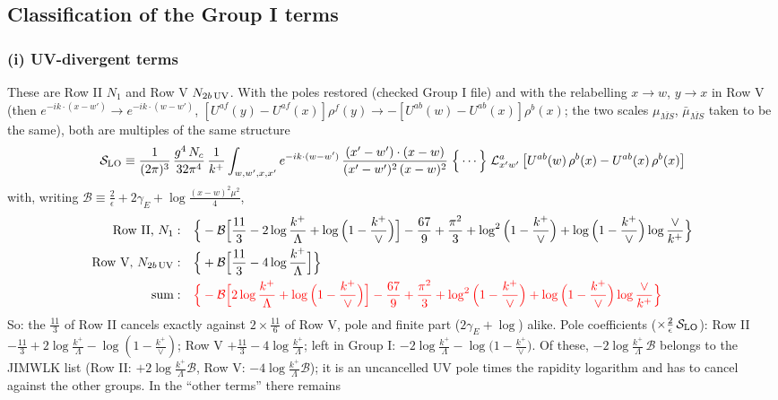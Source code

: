 \documentclass[9pt]{article}
\numberwithin{equation}{section}
\begin{document}
\subsection{Classification of the Group I terms}
\subsubsection*{(i) UV-divergent terms}
These are Row II $N_{1}$ and Row V $N_{2b\,\rm UV}$. With the poles restored (checked Group I file) and with the relabelling $x\to w$, $y\to x$ in Row V (then $e^{-ik\cdot(x-w')}\to e^{-ik\cdot(w-w')}$, $[U^{af}(y)-U^{af}(x)]\rho^{f}(y)\to-[U^{ab}(w)-U^{ab}(x)]\rho^{b}(x)$; the two scales $\mu_{\overline{MS}}$, $\bar\mu_{\overline{MS}}$ taken to be the same), both are multiples of the same structure
\begin{align}
\mathcal{S}_{\rm LO}\equiv\frac{1}{(2\pi)^{3}}\,\frac{g^{4}\,N_{c}}{32\pi^{4}}\,\frac{1}{k^{+}}\int_{w,w',x,x'}e^{-ik\cdot(w-w')}\,\frac{(x'-w')\cdot(x-w)}{(x'-w')^{2}\,(x-w)^{2}}\;\Big\{\cdots\Big\}\;\mathcal{L}^{a}_{x'w'}\left[U^{ab}(w)\,\rho^{b}(x)-U^{ab}(x)\,\rho^{b}(x)\right]\notag
\end{align}
with, writing $\mathcal{B}\equiv\frac{2}{\epsilon}+2\gamma_{E}+\log\frac{(x-w)^{2}\mu^{2}}{4}$,
\begin{align}
\text{Row II, }N_{1}:&\quad\Big\{-\mathcal{B}\Big[\frac{11}{3}-2\log\frac{k^{+}}{\Lambda}+\log\Big(1-\frac{k^{+}}{\vee}\Big)\Big]-\frac{67}{9}+\frac{\pi^{2}}{3}+\log^{2}\Big(1-\frac{k^{+}}{\vee}\Big)+\log\Big(1-\frac{k^{+}}{\vee}\Big)\log\frac{\vee}{k^{+}}\Big\}\notag\\
\text{Row V, }N_{2b\,\rm UV}:&\quad\Big\{+\mathcal{B}\Big[\frac{11}{3}-4\log\frac{k^{+}}{\Lambda}\Big]\Big\}\notag\\
\text{sum}:&\quad{\color{red}\Big\{-\mathcal{B}\Big[2\log\frac{k^{+}}{\Lambda}+\log\Big(1-\frac{k^{+}}{\vee}\Big)\Big]-\frac{67}{9}+\frac{\pi^{2}}{3}+\log^{2}\Big(1-\frac{k^{+}}{\vee}\Big)+\log\Big(1-\frac{k^{+}}{\vee}\Big)\log\frac{\vee}{k^{+}}\Big\}}
\end{align}
So: the $\frac{11}{3}$ of Row II cancels exactly against $2\times\frac{11}{6}$ of Row V, pole and finite part ($2\gamma_{E}+\log$) alike. Pole coefficients ($\times\frac{2}{\epsilon}\,\mathcal{S}_{\rm LO}$): Row II $-\frac{11}{3}+2\log\frac{k^{+}}{\Lambda}-\log(1-\frac{k^{+}}{\vee})$; Row V $+\frac{11}{3}-4\log\frac{k^{+}}{\Lambda}$; left in Group I: $-2\log\frac{k^{+}}{\Lambda}-\log\big(1-\frac{k^{+}}{\vee}\big)$. Of these, $-2\log\frac{k^{+}}{\Lambda}\,\mathcal{B}$ belongs to the JIMWLK list (Row II: $+2\log\frac{k^{+}}{\Lambda}\mathcal{B}$, Row V: $-4\log\frac{k^{+}}{\Lambda}\mathcal{B}$); it is an uncancelled UV pole times the rapidity logarithm and has to cancel against the other groups. In the ``other terms'' there remains
\end{document}
